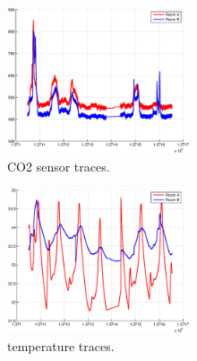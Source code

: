
\begin{figure}[h!]
\centering
    \includegraphics[width=0.48\textwidth]{figs/co2_pair.eps}
    \caption{CO2 sensor traces.}
\label{fig:co2traces}
\end{figure}

\begin{figure}[h!]
\centering
    \includegraphics[width=0.48\textwidth]{figs/temp_pair.eps}
    \caption{temperature traces.}
\label{fig:temptraces}
\end{figure}

% 

